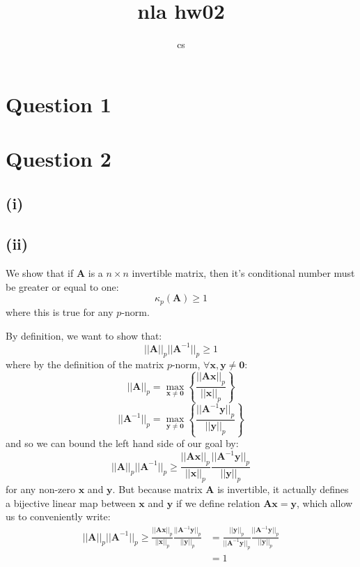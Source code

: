 \documentclass[10pt]{article}
\title{nla hw02}
\author{cs}
\newcommand{\vc}[1]{\boldsymbol{#1}}
\newcommand{\mat}[1]{\mathbf{#1}}
\begin{document}
\maketitle

\section{Question 1}

\section{Question 2}

\subsection{(i)}

\subsection{(ii)}
We show that if $\mathbf{A}$ is a $n\times n$ invertible matrix, then it's
conditional number must be greater or equal to one:
$$\kappa_p(\mathbf{A})\geq1$$
where this is true for any $p$-norm.

\noindent\hrulefill

By definition, we want to show that:
$$||\mathbf{A}||_p ||\mathbf{A}^{-1}||_p\geq1$$
where by the definition of the matrix $p$-norm, $\forall\mat{x},
\mat{y}\neq\vc{0}$:
$$||\mat{A}||_p=
\max_{\mat{x}\neq\mat{0}}
\left\{\frac{||\mat{A}\mat{x}||_p}{||\mat{x}||_p}\right\}$$
$$||\mat{A}^{-1}||_p=
\max_{\mat{y}\neq\mat{0}}
\left\{\frac{||\mat{A}^{-1}\mat{y}||_p}{||\mat{y}||_p}\right\}$$
and so we can bound the left hand side of our goal by:
$$||\mathbf{A}||_p ||\mathbf{A}^{-1}||_p
\geq
\frac{||\mat{A}\mat{x}||_p}{||\mat{x}||_p}
\frac{||\mat{A}^{-1}\mat{y}||_p}{||\mat{y}||_p}$$
for any non-zero $\mat{x}$ and $\mat{y}$. But because matrix $\mat{A}$ is
invertible, it actually defines a bijective linear map between $\mat{x}$ and
$\mat{y}$ if we define relation $\mat{A}\mat{x}=\mat{y}$, which allow us to
conveniently write:
\begin{align*}
    ||\mathbf{A}||_p ||\mathbf{A}^{-1}||_p
    \geq
    \frac{||\mat{A}\mat{x}||_p}{||\mat{x}||_p}
    \frac{||\mat{A}^{-1}\mat{y}||_p}{||\mat{y}||_p}
    &=
    \frac{||\mat{y}||_p}{||\mat{A}^{-1}\mat{y}||_p}
    \frac{||\mat{A}^{-1}\mat{y}||_p}{||\mat{y}||_p} \\
    &=1
\end{align*}
\end{document}
